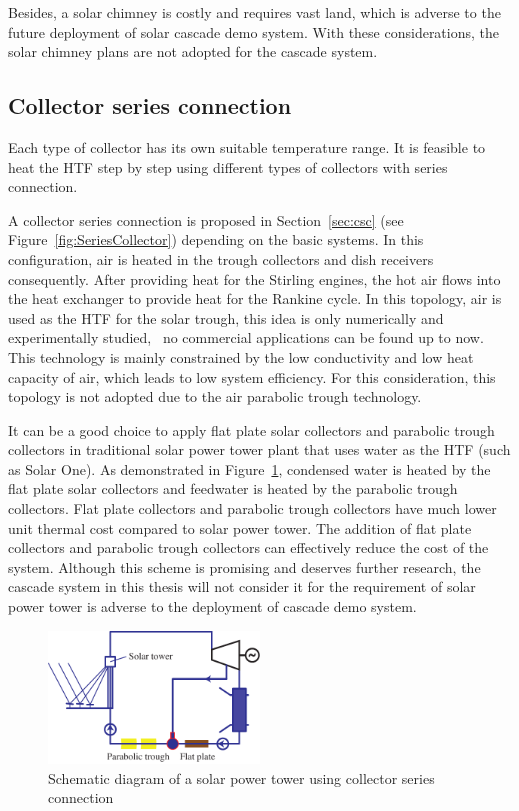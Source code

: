 Besides, a solar chimney is costly and requires vast land, which is adverse to the future deployment of solar cascade demo system. With these considerations, the solar chimney plans are not adopted for the cascade system. 

\subsection{Collector series connection}
Each type of collector has its own suitable temperature range. It is feasible to heat the HTF step by step using different types of collectors with series connection.

A collector series connection is proposed in Section~\ref{sec:csc} (see Figure~\ref{fig:SeriesCollector}) depending on the basic systems. In this configuration, air is heated in the trough collectors and dish receivers consequently. After providing heat for the Stirling engines, the hot air flows into the heat exchanger to provide heat for the Rankine cycle. In this topology, air is used as the HTF for the solar trough, this idea is only numerically and experimentally studied,~\cite{Good2015,Good2016} no commercial applications can be found up to now. This technology is mainly constrained by the low conductivity and low heat capacity of air, which leads to low system efficiency. For this consideration, this topology is not adopted due to the air parabolic trough technology.

It can be a good choice to apply flat plate solar collectors and parabolic trough collectors in traditional solar power tower plant that uses water as the HTF (such as Solar One). As demonstrated in Figure~\ref{fig:seriesCollection}, condensed water is heated by the flat plate solar collectors and feedwater is heated by the parabolic trough collectors. Flat plate collectors and parabolic trough collectors have much lower unit thermal cost compared to solar power tower. The addition of flat plate collectors and parabolic trough collectors can effectively reduce the cost of the system. Although this scheme is promising and deserves further research, the cascade system in this thesis will not consider it for the requirement of solar power tower is adverse to the deployment of cascade demo system.

\begin{figure}[!ht]
\centering 
\includegraphics[width=0.5\textwidth]{fig/SeriesCollection}
\caption{Schematic diagram of a solar power tower using collector series connection}\label{fig:seriesCollection}
\end{figure}

